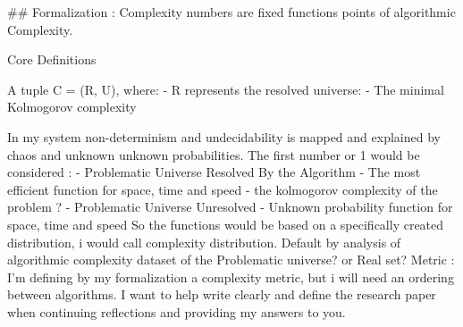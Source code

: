 ## Formalization : Complexity numbers are fixed functions points of algorithmic Complexity. 

Core Definitions

A tuple C = (R, U), where:
    - R represents the resolved universe:
      - The minimal Kolmogorov complexity 


In my system non-determinism and undecidability is mapped and explained by chaos and unknown unknown probabilities. 
 The first number or 1 would be  considered :
    - Problematic Universe Resolved By the Algorithm
        - The most efficient function for space, time and speed
        - the kolmogorov complexity of the problem ?
    - Problematic Universe Unresolved
        - Unknown probability function for space, time and speed
So the functions would be based on a specifically created distribution, i would call complexity distribution. 
Default by analysis of algorithmic complexity dataset of the Problematic universe? or Real set?
Metric : I'm defining by my formalization a complexity metric, but i will need an ordering between algorithms. 
I want to help write clearly and define the research paper when continuing reflections and providing my answers to you.

